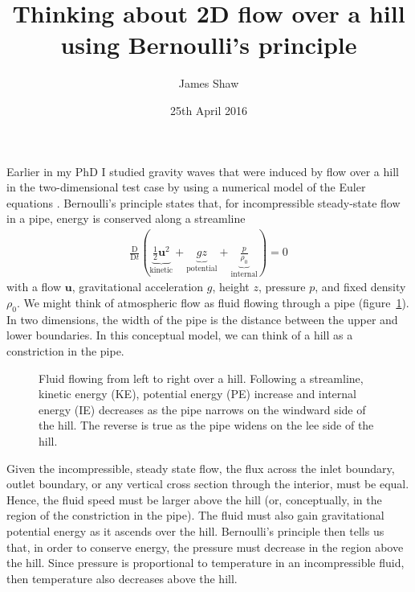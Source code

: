 \documentclass{article}
\title{Thinking about 2D flow over a hill using Bernoulli's principle}
\author{James Shaw}
\date{25th April 2016}
\begin{document}
\maketitle

Earlier in my PhD I studied gravity waves that were induced by flow over a hill in the two-dimensional test case by \citet{schaer2002} using a numerical model of the Euler equations \citep{shaw-weller2016}.  Bernoulli's principle states that, for incompressible steady-state flow in a pipe, energy is conserved along a streamline \citep{vallis2006}
\begin{align}
	\frac{\mathrm{D}}{\mathrm{D}t} \left( \underbrace{\frac{1}{2}\bm{u}^2}_\text{kinetic} + \underbrace{gz}_\text{potential} + \underbrace{\frac{p}{\rho_0}}_\text{internal} \right) = 0
\end{align}
with a flow $\bm{u}$, gravitational acceleration $g$, height $z$, pressure $p$, and fixed density $\rho_0$.
We might think of atmospheric flow as fluid flowing through a pipe (figure~\ref{fig:pipe}).  In two dimensions, the width of the pipe is the distance between the upper and lower boundaries.  In this conceptual model, we can think of a hill as a constriction in the pipe.

\begin{figure}
	\centering
	\caption{Fluid flowing from left to right over a hill.  Following a streamline, kinetic energy (KE), potential energy (PE) increase and internal energy (IE) decreases as the pipe narrows on the windward side of the hill.  The reverse is true as the pipe widens on the lee side of the hill.}
	\label{fig:pipe}
\end{figure}

Given the incompressible, steady state flow, the flux across the inlet boundary, outlet boundary, or any vertical cross section through the interior, must be equal.  Hence, the fluid speed must be larger above the hill (or, conceptually, in the region of the constriction in the pipe).  The fluid must also gain gravitational potential energy as it ascends over the hill.  Bernoulli's principle then tells us that, in order to conserve energy, the pressure must decrease in the region above the hill.  Since pressure is proportional to temperature in an incompressible fluid, then temperature also decreases above the hill.
\end{document}
